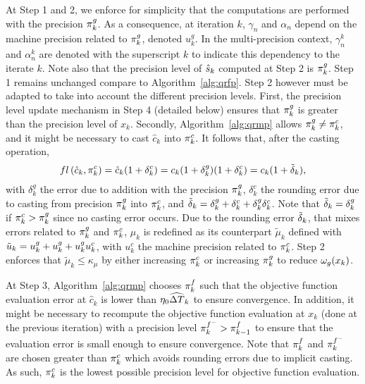 \documentclass{article}[12pt]
\begin{document}
	At Step 1 and 2, we enforce for simplicity that the computations are performed with the precision $\pi_{k}^g$. As a consequence, at iteration $k$, $\gamma_n$ and $\alpha_n$ depend on the machine precision related to $\pi_{k}^g$, denoted $u_k^g$. In the multi-precision context, $\gamma_n^k$ and $\alpha_n^k$ are denoted with the superscript $k$ to indicate this dependency to the iterate $k$.
	Note also that the precision level of $\hat{s}_{k}$ computed at Step 2 is $\pi_{k}^g$. Step 1 remains unchanged compare to Algorithm~\ref{alg:qrfp}. Step 2 however must be adapted to take into account the different precision levels. First, the precision level update mechanism in Step 4 (detailed below) ensures that $\pi_{k}^g$ is greater than the precision level of $x_k$. Secondly, Algorithm~\ref{alg:qrmp} allows $\pi_{k}^g\neq \pi_{k}^c$, and it might be necessary to cast $\hat{c}_k$ into $\pi_{k}^c$. It follows that, after the casting operation,
	\begin{equation*}
		fl\left(\hat{c}_k,\pi_{k}^c\right) = \hat{c}_k(1+\delta_k^c) = c_k(1+\delta_{k}^g)(1+\delta_{k}^c) =  c_k(1+\tilde{\delta}_{k}),
	\end{equation*}
	with $\delta_{k}^g$ the error due to addition with the precision $\pi_{k}^g$, $\delta_{k}^c$ the rounding error due to casting from precision $\pi_{k}^g$ into $\pi_{k}^c$, and $\tilde{\delta}_{k} = \delta_{k}^g + \delta_{k}^c +\delta_{k}^g\delta_{k}^c$. Note that $\tilde{\delta}_{k} = \delta_{k}^g$ if $\pi_{k}^c > \pi_{k}^g$ since no casting error occurs. Due to the rounding error $\tilde{\delta}_{k}$, that mixes errors related to $\pi_{k}^g$ and $\pi_{k}^c$, $\mu_k$ is redefined as its counterpart $\tilde{\mu}_k$ defined  with $\tilde{u}_{k} = u_k^g + u_k^g +u_k^g u_k^c$, with $u_k^c$ the machine precision related to $\pi_{k}^c$. Step 2 enforces that $\tilde{\mu}_k\leq \kappa_\mu$ by either increasing $\pi_{k}^c$ or increasing $\pi_{k}^g$ to reduce $\omega_g(x_k)$.
	
	At Step 3, Algorithm~\ref{alg:qrmp} chooses $\pi_{k}^f$ such that the objective function evaluation error at $\hat{c}_k$ is lower than $\eta_0\widehat{\Delta T}_k$ to ensure convergence. In addition, it might be necessary to recompute the objective function evaluation at $x_k$ (done at the previous iteration) with a precision level $\pi_{k}^{f^-} > \pi_{k-1}^f$ to ensure that the evaluation error is small enough to ensure convergence. Note that $\pi_{k}^f$ and $\pi_{k}^{f^-}$ are chosen greater than $\pi_{k}^c$ which avoids rounding errors due to implicit casting. As such, $\pi_{k}^c$ is the lowest possible precision level for objective function evaluation.
	
\end{document}
